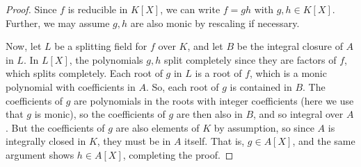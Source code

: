 \begin{proof}
	Since $f$ is reducible in $K[X]$, we can write $f = gh$ with $g,h \in K[X]$. Further, we may assume $g,h$ are also monic by rescaling if necessary.
	
	Now, let $L$ be a splitting field for $f$ over $K$, and let $B$ be the integral closure of $A$ in $L$. In $L[X]$, the polynomials $g,h$ split completely since they are factors of $f$, which splits completely. Each root of $g$ in $L$ is a root of $f$, which is a monic polynomial with coefficients in $A$. So, each root of $g$ is contained in $B$. The coefficients of $g$ are polynomials in the roots with integer coefficients (here we use that $g$ is monic), so the coefficients of $g$ are then also in $B$, and so integral over $A$. But the coefficients of $g$ are also elements of $K$ by assumption, so since $A$ is integrally closed in $K$, they must be in $A$ itself. That is, $g \in A[X]$, and the same argument shows $h \in A[X]$, completing the proof.
\end{proof}
